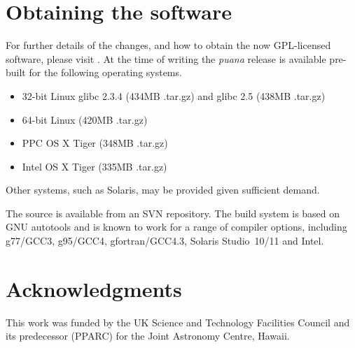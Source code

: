 \documentclass[11pt,twoside]{article}  %
\begin{document}
\section{Obtaining the software} For further details of the changes,
and how to obtain the now GPL-licensed software, please visit
.  At the time of writing 
the {\em puana} release is available pre-built for the following operating 
systems.
\begin{itemize}
\item 32-bit Linux glibc 2.3.4 (434MB .tar.gz) and glibc 2.5 (438MB .tar.gz)
\item 64-bit Linux (420MB .tar.gz)
\item PPC OS X Tiger (348MB .tar.gz)
\item Intel OS X Tiger (335MB .tar.gz)
\end{itemize}
Other systems, such as Solaris, may be provided given sufficient demand.

The source is available from an SVN repository.  The build system is
based on GNU autotools and is known to work for a range of compiler   
options, including g77/GCC3, g95/GCC4, gfortran/GCC4.3, Solaris Studio~10/11 
and Intel.

\section{Acknowledgments}
This work was funded by the UK Science and Technology Facilities Council
and its predecessor (PPARC) for the Joint Astronomy Centre, Hawaii.
\end{document}
